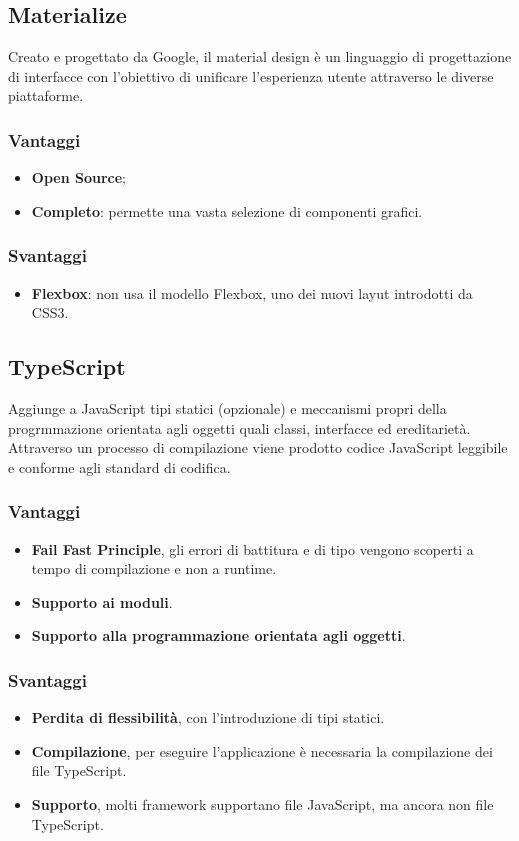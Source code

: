 \subsection{Materialize}
Creato e progettato da Google, il material design è un linguaggio di progettazione di interfacce con l'obiettivo di unificare l'esperienza utente attraverso le diverse piattaforme.
\subsubsection{Vantaggi}
\begin{itemize}
\item \textbf{Open Source};
\item \textbf{Completo}: permette una vasta selezione di componenti grafici.
\end{itemize}
\subsubsection{Svantaggi}
\begin{itemize}
\item \textbf{Flexbox}: non usa il modello Flexbox, uno dei nuovi layut introdotti da CSS3.
\end{itemize}
\subsection{TypeScript}
Aggiunge a JavaScript tipi statici (opzionale) e meccanismi propri della progrmmazione orientata agli oggetti quali classi, interfacce ed ereditariet\`a. Attraverso un processo di compilazione viene prodotto codice JavaScript leggibile e conforme agli standard di codifica. 
\subsubsection{Vantaggi}
\begin{itemize}
\item \textbf{Fail Fast Principle}, gli errori di battitura e di tipo vengono scoperti a tempo di compilazione e non a runtime.
\item \textbf{Supporto ai moduli}.
\item \textbf{Supporto alla programmazione orientata agli oggetti}.
\end{itemize}
\subsubsection{Svantaggi}
\begin{itemize}
\item \textbf{Perdita di flessibilit\`a}, con l'introduzione di tipi statici.
\item \textbf{Compilazione}, per eseguire l'applicazione \`e necessaria la compilazione dei file TypeScript.
\item \textbf{Supporto}, molti framework supportano file JavaScript, ma ancora non file TypeScript.
\end{itemize}